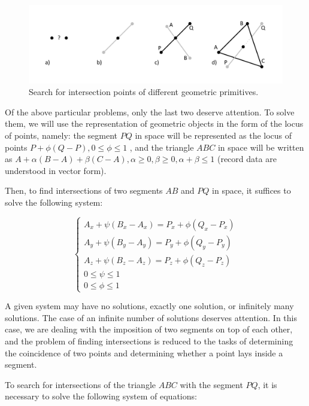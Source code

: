 \documentclass[
11pt,%
tightenlines,%
twoside,%
onecolumn,%
nofloats,%
nobibnotes,%
nofootinbib,%
superscriptaddress,%
noshowpacs,%
centertags]%
{revtex4}
\begin{document}
\begin{figure}[h]
\includegraphics[width=1.0\textwidth]{pics/pic_intersection_s.pdf}
\caption{Search for intersection points of different geometric primitives.}\label{fig:pic_intersection_s}
\end{figure}

Of the above particular problems, only the last two deserve attention.
To solve them, we will use the representation of geometric objects in the form of the locus of points, namely: the segment $PQ$ in space will be represented as the locus of points $P + \phi(Q - P), 0 \le \phi \le 1$ , and the triangle $ABC$ in space will be written as $A + \alpha(B - A) + \beta(C - A), \alpha \ge 0, \beta \ge 0, \alpha + \beta \le 1$ (record data are understood in vector form).

Then, to find intersections of two segments $AB$ and $PQ$ in space, it suffices to solve the following system:

\begin{equation}
\begin{cases}
A_x + \psi(B_x - A_x) = P_x + \phi(Q_x - P_x) \\
A_y + \psi(B_y - A_y) = P_y + \phi(Q_y - P_y) \\
A_z + \psi(B_z - A_z) = P_z + \phi(Q_z - P_z) \\
0 \le \psi \le 1 \\
0 \le \phi \le 1
\end{cases}
\end{equation}

A given system may have no solutions, exactly one solution, or infinitely many solutions.
The case of an infinite number of solutions deserves attention.
In this case, we are dealing with the imposition of two segments on top of each other, and the problem of finding intersections is reduced to the tasks of determining the coincidence of two points and determining whether a point lays inside a segment.

To search for intersections of the triangle $ABC$ with the segment $PQ$, it is necessary to solve the following system of equations:
\end{document}
